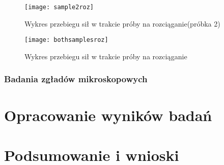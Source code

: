 \documentclass[magister,druk]{dyplom}
\begin{document}
\begin{figure}
	\texttt{[image: sample2roz]}
	\caption{Wykres przebiegu sił w trakcie próby na rozciąganie(próbka 2)}
\end{figure}

\begin{figure}
	\texttt{[image: bothsamplesroz]}
	\caption{Wykres przebiegu sił w trakcie próby na rozciąganie}
\end{figure}

\subsection{Badania zgładów mikroskopowych}

\chapter{Opracowanie wyników badań}
\chapter{Podsumowanie i wnioski}

\nocite{*}


\end{document}
